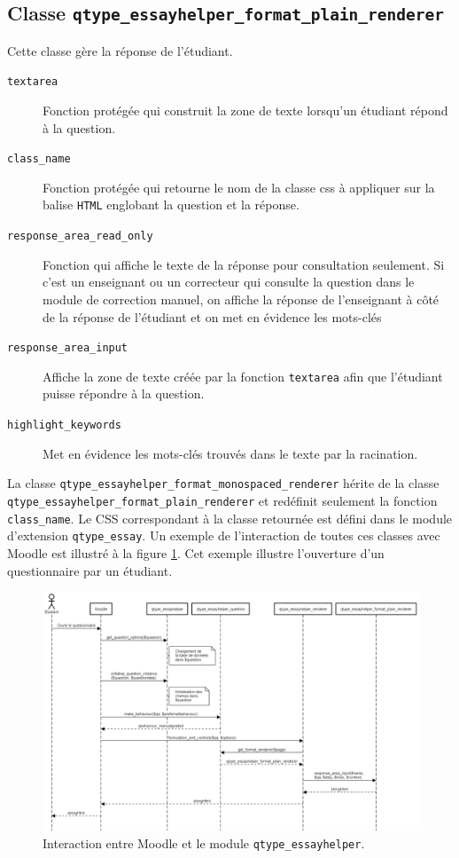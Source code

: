 \subsection*{Classe \texttt{qtype\_essayhelper\_format\_plain\_renderer}}
Cette classe g\`ere la r\'eponse de l'\'etudiant.
\begin{description}
  \item[\texttt{textarea}] Fonction prot\'eg\'ee qui construit la zone de texte lorsqu'un \'etudiant r\'epond \`a la question.
  \item[\texttt{class\_name}] Fonction prot\'eg\'ee qui retourne le nom de la classe css \`a appliquer sur la balise \texttt{HTML} englobant la question et la r\'eponse.
  \item[\texttt{response\_area\_read\_only}] Fonction qui affiche le texte de la r\'eponse pour consultation seulement. Si c'est un enseignant ou un correcteur qui consulte la question dans le module de correction manuel, on affiche la r\'eponse de l'enseignant \`a c\^ot\'e de la r\'eponse de l'\'etudiant et on met en \'evidence les mots-cl\'es
  \item[\texttt{response\_area\_input}] Affiche la zone de texte cr\'e\'ee par la fonction \texttt{textarea} afin que l'\'etudiant puisse r\'epondre \`a la question.
  \item[\texttt{highlight\_keywords}] Met en \'evidence les mots-cl\'es trouv\'es dans le texte par la racination.
\end{description}
La classe \texttt{qtype\_essayhelper\_format\_monospaced\_renderer} h\'erite de la classe \texttt{qtype\_essayhelper\_format\_plain\_renderer} et red\'efinit seulement la fonction \texttt{class\_name}.
Le CSS correspondant \`a la classe retourn\'ee est d\'efini dans le module d'extension \texttt{qtype\_essay}.
Un exemple de l'interaction de toutes ces classes avec Moodle est illustr\'e \`a la figure \ref{dev-diagramme}.
Cet exemple illustre l'ouverture d'un questionnaire par un \'etudiant.
\begin{landscape}
\begin{figure}[h!]
  \includegraphics[scale=0.4]{images/diagramme-flux.png}
  \caption{Interaction entre Moodle et le module \texttt{qtype\_essayhelper}.}
  \label{dev-diagramme}
\end{figure}
\end{landscape}
